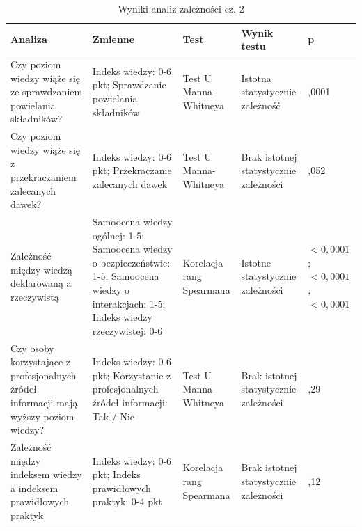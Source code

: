 \begin{table}[H]
    \centering
    \renewcommand{\arraystretch}{1,3}%
    \caption{Wyniki analiz zależności cz. 2}
    \label{tab:wyniki-analiz-2}
    \begin{tabularx}{\textwidth}{|X|X|
        >{\centering\arraybackslash}p{2cm}|
        >{\centering\arraybackslash}p{}|
        >{\centering\arraybackslash}p{}|}
        \hline
        \textbf{Analiza} & \textbf{Zmienne} & \textbf{Test} & \textbf{Wynik testu} & \textbf{p} \\
        \hline
        \hline
        Czy poziom wiedzy wiąże się ze sprawdzaniem powielania składników? &
        Indeks wiedzy: 0-6 pkt; Sprawdzanie powielania składników &
        Test U Manna-Whitneya &
        Istotna statystycznie zależność & 
        0,0001  \\
        \hline
        Czy poziom wiedzy wiąże się z przekraczaniem zalecanych dawek? &
        Indeks wiedzy: 0-6 pkt; Przekraczanie zalecanych dawek &
        Test U Manna-Whitneya &
        Brak istotnej statystycznie zależności & 
        0,052  \\
        \hline
        Zależność między wiedzą deklarowaną a rzeczywistą &
        Samoocena wiedzy ogólnej: 1-5; Samoocena wiedzy o bezpieczeństwie: 1-5; Samoocena wiedzy o interakcjach: 1-5; Indeks wiedzy rzeczywistej: 0-6 &
        Korelacja rang Spearmana &
        Istotne statystycznie zależności & 
        $< 0,0001$; $< 0,0001$; $< 0,0001$ \\
        \hline
        Czy osoby korzystające z profesjonalnych źródeł informacji mają wyższy poziom wiedzy? &
        Indeks wiedzy: 0-6 pkt; Korzystanie z profesjonalnych źródeł informacji: Tak / Nie &
        Test U Manna-Whitneya &
        Brak istotnej statystycznie zależności & 
        0,29 \\
        \hline
        Zależność między indeksem wiedzy a indeksem prawidłowych praktyk &
        Indeks wiedzy: 0-6 pkt;  Indeks prawidłowych praktyk: 0-4 pkt &
        Korelacja rang Spearmana &
        Brak istotnej statystycznie zależności & 
        0,12 \\
        \hline
    \end{tabularx}
\end{table}


